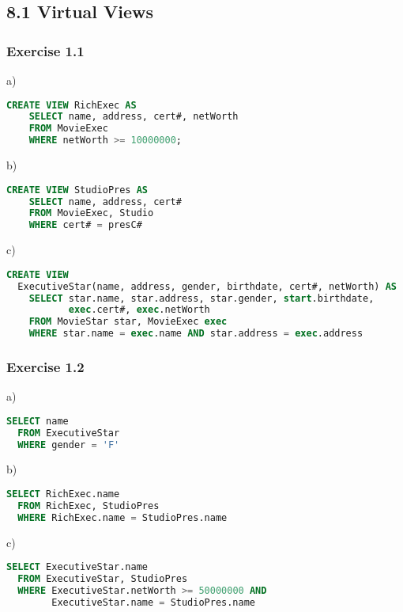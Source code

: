 \documentclass[../../main.tex]{subfiles}
\begin{document}
\subsection{8.1 Virtual Views}

\subsubsection*{Exercise 1.1}

a)

\begin{lstlisting}[language=sql]
  CREATE VIEW RichExec AS
    SELECT name, address, cert#, netWorth
    FROM MovieExec
    WHERE netWorth >= 10000000;
\end{lstlisting}

b)

\begin{lstlisting}[language=sql]
  CREATE VIEW StudioPres AS
    SELECT name, address, cert#
    FROM MovieExec, Studio
    WHERE cert# = presC#
\end{lstlisting}

c)

\begin{lstlisting}[language=sql]
  CREATE VIEW
  ExecutiveStar(name, address, gender, birthdate, cert#, netWorth) AS
    SELECT star.name, star.address, star.gender, start.birthdate,
           exec.cert#, exec.netWorth
    FROM MovieStar star, MovieExec exec
    WHERE star.name = exec.name AND star.address = exec.address
\end{lstlisting}

\subsubsection*{Exercise 1.2}

a)

\begin{lstlisting}[language=sql]
  SELECT name
  FROM ExecutiveStar
  WHERE gender = 'F'
\end{lstlisting}

b)

\begin{lstlisting}[language=sql]
  SELECT RichExec.name
  FROM RichExec, StudioPres
  WHERE RichExec.name = StudioPres.name
\end{lstlisting}

c)

\begin{lstlisting}[language=sql]
  SELECT ExecutiveStar.name
  FROM ExecutiveStar, StudioPres
  WHERE ExecutiveStar.netWorth >= 50000000 AND
        ExecutiveStar.name = StudioPres.name
\end{lstlisting}
\end{document}
